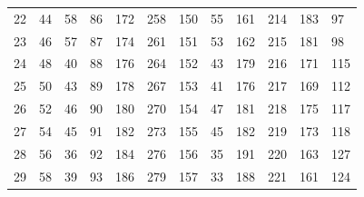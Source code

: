 \begin{table}[]
\begin{tabular}{llllllllllll}
22                     & 44                     & 58                     & 86                     & 172                    & 258                    & 150                    & 55                     & 161                    & 214                    & 183                    & 97                     \\
23                     & 46                     & 57                     & 87                     & 174                    & 261                    & 151                    & 53                     & 162                    & 215                    & 181                    & 98                     \\
24                     & 48                     & 40                     & 88                     & 176                    & 264                    & 152                    & 43                     & 179                    & 216                    & 171                    & 115                    \\
25                     & 50                     & 43                     & 89                     & 178                    & 267                    & 153                    & 41                     & 176                    & 217                    & 169                    & 112                    \\
26                     & 52                     & 46                     & 90                     & 180                    & 270                    & 154                    & 47                     & 181                    & 218                    & 175                    & 117                    \\
27                     & 54                     & 45                     & 91                     & 182                    & 273                    & 155                    & 45                     & 182                    & 219                    & 173                    & 118                    \\
28                     & 56                     & 36                     & 92                     & 184                    & 276                    & 156                    & 35                     & 191                    & 220                    & 163                    & 127                    \\
29                     & 58                     & 39                     & 93                     & 186                    & 279                    & 157                    & 33                     & 188                    & 221                    & 161                    & 124                    \\

\end{tabular}
\end{table}
